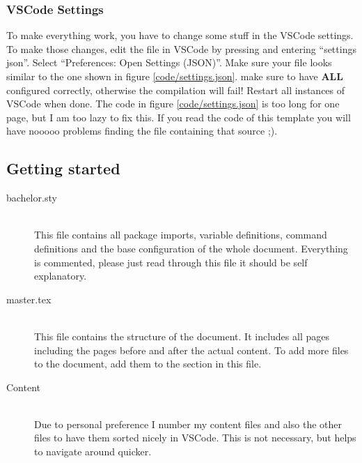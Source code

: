 \subsubsection{VSCode Settings}
To make everything work, you have to change some stuff in the VSCode settings.
\breakit
To make those changes, edit the  file in VSCode by pressing \keywordHighlight{[CTRL]+[SHIFT]+[P]} and entering \enquote{settings json}. Select \enquote{Preferences: Open Settings (JSON)}. Make sure your file looks similar to the one shown in figure \ref{code/settings.json}. make sure to have \textbf{ALL}  configured correctly, otherwise the compilation will fail! Restart all instances of VSCode when done. The code in figure \ref{code/settings.json} is too long for one page, but I am too lazy to fix this. If you read the code of this template you will have nooooo problems finding the file containing that source ;).

\FloatBarrier

\subsection{Getting started}

\begin{description}
  \item[bachelor.sty]\hfill\\
        This file contains all package imports, variable definitions, command definitions and the base configuration of the whole document. Everything is commented, please just read through this file it should be self explanatory.
  \item[master.tex]\hfill\\
        This file contains the structure of the document. It includes all pages including the pages before and after the actual content. To add more  files to the document, add them to the section in this file.
  \item[Content]\hfill\\
        Due to personal preference I number my content files and also the other files to have them sorted nicely in VSCode. This is not necessary, but helps to navigate around quicker.
\end{description}
